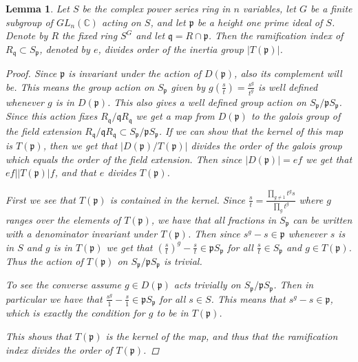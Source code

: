 \documentclass[11pt, a4paper, english]{article}
\newtheorem{lemma}[theorem]{Lemma}
\theoremstyle{definition}
\newcommand{\C}{\mathbb{C}}
\begin{document}
\begin{lemma}
Let $S$ be the complex power series ring in $n$ variables, let $G$ be  a finite subgroup of $GL_n(\C)$ acting on $S$, and let $\mathfrak{p}$ be a height one prime ideal of $S$. Denote by $R$ the fixed ring $S^G$ and let $\mathfrak{q} = R \cap \mathfrak{p}$. Then the ramification index of $R_\mathfrak{q} \subset S_\mathfrak{p}$, denoted by $e$, divides order of the inertia group $|T(\mathfrak{p})|$.

\begin{proof}
Since $\mathfrak{p}$ is invariant under the action of $D(\mathfrak{p})$, also its complement will be. This means the group action on $S_\mathfrak{p}$ given by $g(\frac{s}{t}) = \frac{s^g}{t^g}$ is well defined whenever $g$ is in $D(\mathfrak{p})$. This also gives a well defined group action on $S_\mathfrak{p}/\mathfrak{p}S_\mathfrak{p}$. Since this action fixes $R_\mathfrak{q}/\mathfrak{q}R_\mathfrak{q}$ we get a map from $D(\mathfrak{p})$ to the galois group of the field extension $R_\mathfrak{q}/\mathfrak{q}R_\mathfrak{q} \subset S_\mathfrak{p}/\mathfrak{p}S_\mathfrak{p}$. If we can show that the kernel of this map is $T(\mathfrak{p})$, then we get that $|D(\mathfrak{p})/T(\mathfrak{p})|$ divides the order of the galois group which equals the order of the field extension. Then since $|D(\mathfrak{p})| = ef$ we get that $ef \Big| |T(\mathfrak{p})|f$, and that $e$ divides $T(\mathfrak{p})$.

First we see that $T(\mathfrak{p})$ is contained in the kernel. Since $\frac{s}{t} = \frac{\prod_{g \neq 1}t^g s}{\prod_g t^g}$ where $g$ ranges over the elements of $T(\mathfrak{p})$, we have that all fractions in $S_\mathfrak{p}$ can be written with a denominator invariant under $T(\mathfrak{p})$. Then since $s^g - s \in \mathfrak{p}$ whenever $s$ is in $S$ and $g$ is in $T(\mathfrak{p})$ we get that $\left(\frac{s}{t}\right)^g - \frac{s}{t} \in \mathfrak{p}S_\mathfrak{p}$ for all $\frac{s}{t} \in S_\mathfrak{p}$ and $g \in T(\mathfrak{p})$. Thus the action of $T(\mathfrak{p})$ on $S_\mathfrak{p}/\mathfrak{p}S_\mathfrak{p}$ is trivial.

To see the converse assume $g \in D(\mathfrak{p})$ acts trivially on $S_\mathfrak{p}/\mathfrak{p}S_\mathfrak{p}$. Then in particular we have that $\frac{s^g}{1} - \frac{s}{1} \in \mathfrak{p}S_\mathfrak{p}$ for all $s \in S$. This means that $s^g - s \in \mathfrak{p}$, which is exactly the condition for $g$ to be in $T(\mathfrak{p})$.

This shows that $T(\mathfrak{p})$ is the kernel of the map, and thus that the ramification index divides the order of $T(\mathfrak{p})$.
\end{proof}
\end{lemma}
\end{document}
